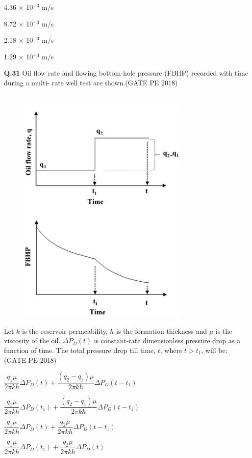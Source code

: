 \documentclass[15pt,a4paper]{article}
\begin{document}
\begin{enumerate}
\begin{multicols}{2}

\item 4.36 $\times$ 10$^{-3}$ m/s \item 8.72 $\times$ 10$^{-3}$ m/s 
\item 2.18 $\times$ 10$^{-3}$ m/s \item 1.29 $\times$ 10$^{-3}$ m/s 
\end{multicols}
\end{enumerate}

\noindent
\textbf{Q.31} Oil flow rate and flowing bottom-hole pressure (FBHP) recorded with time during a multi-
rate well test are shown.\hfill(GATE PE 2018)\\\\

\begin{figure}[h!]
  \centering
  \includegraphics[width=0.5\columnwidth]{pic10.png} 
\end{figure}



Let $k$ is the reservoir permeability, $h$ is the formation thickness and $\mu$ is the viscosity of the oil. $\Delta P_D(t)$ is constant-rate dimensionless pressure drop as a function of time. The total pressure drop till time, $t$, where $t > t_1$, will be: \hfill (GATE PE 2018)

\begin{enumerate}
\begin{multicols}{2}
\item $\dfrac{q_1 \mu}{2 \pi k h} \Delta P_D(t) + \dfrac{(q_2 - q_1) \mu}{2 \pi k h} \Delta P_D(t - t_1)$ 

\item $\dfrac{q_1 \mu}{2 \pi k h} \Delta P_D(t_1) + \dfrac{(q_2 - q_1) \mu}{2 \pi k h} \Delta P_D(t - t_1)$

\item $\dfrac{q_1 \mu}{2 \pi k h} \Delta P_D(t) + \dfrac{q_2 \mu}{2 \pi k h} \Delta P_D(t - t_1)$

\item $\dfrac{q_1 \mu}{2 \pi k h} \Delta P_D(t_1) + \dfrac{q_2 \mu}{2 \pi k h} \Delta P_D(t)$
\end{multicols}
\end{enumerate}
\end{document}
